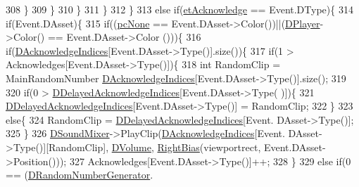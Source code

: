 \begin{DoxyCode}
308                         \}
309                     \}
310                 \}
311             \}
312         \}
313         \textcolor{keywordflow}{else} \textcolor{keywordflow}{if}(\hyperlink{GameModel_8h_abfcf510bafec7c6429906a6ecaac656da9b68fc38f3ca4002cd7a3ec3cc07a612}{etAcknowledge} == Event.DType)\{
314             \textcolor{keywordflow}{if}(Event.DAsset)\{
315                 \textcolor{keywordflow}{if}((\hyperlink{GameDataTypes_8h_aafb0ca75933357ff28a6d7efbdd7602fa88767aa8e02c7b3192bbab4127b3d729}{pcNone} == Event.DAsset->Color())||(\hyperlink{classCSoundEventRenderer_ad98889d7f52477a2e148d7e390641d51}{DPlayer}->Color() == Event.DAsset->Color
      ()))\{
316                     \textcolor{keywordflow}{if}(\hyperlink{classCSoundEventRenderer_ad52a927e172ab9a00dbf1f707e1fb724}{DAcknowledgeIndices}[Event.DAsset->Type()].size())\{
317                         \textcolor{keywordflow}{if}(1 > Acknowledges[Event.DAsset->Type()])\{
318                             \textcolor{keywordtype}{int} RandomClip = MainRandomNumber %
      \hyperlink{classCSoundEventRenderer_ad52a927e172ab9a00dbf1f707e1fb724}{DAcknowledgeIndices}[Event.DAsset->Type()].size();
319                             
320                             \textcolor{keywordflow}{if}(0 > \hyperlink{classCSoundEventRenderer_a8e36efd07e98242ea3a80564c595e397}{DDelayedAcknowledgeIndices}[Event.DAsset->Type(
      )])\{
321                                 \hyperlink{classCSoundEventRenderer_a8e36efd07e98242ea3a80564c595e397}{DDelayedAcknowledgeIndices}[Event.DAsset->Type()] 
      = RandomClip;
322                             \}
323                             \textcolor{keywordflow}{else}\{
324                                 RandomClip = \hyperlink{classCSoundEventRenderer_a8e36efd07e98242ea3a80564c595e397}{DDelayedAcknowledgeIndices}[Event.
      DAsset->Type()];    
325                             \}
326                             \hyperlink{classCSoundEventRenderer_a5abf598a7e8783d9cc78e0d33a65c9c2}{DSoundMixer}->PlayClip(\hyperlink{classCSoundEventRenderer_ad52a927e172ab9a00dbf1f707e1fb724}{DAcknowledgeIndices}[Event.
      DAsset->Type()][RandomClip], \hyperlink{classCSoundEventRenderer_a3812aeb93aef90635a7da72fc101c686}{DVolume}, \hyperlink{classCSoundEventRenderer_a4be5ff09785c55c3b5b6966fb41eb47f}{RightBias}(viewportrect, Event.DAsset->Position()));
327                             Acknowledges[Event.DAsset->Type()]++;
328                         \}
329                         \textcolor{keywordflow}{else} \textcolor{keywordflow}{if}(0 == (\hyperlink{classCSoundEventRenderer_a591b9430a0f6a70259f87a2467de908f}{DRandomNumberGenerator}.

\end{DoxyCode}
